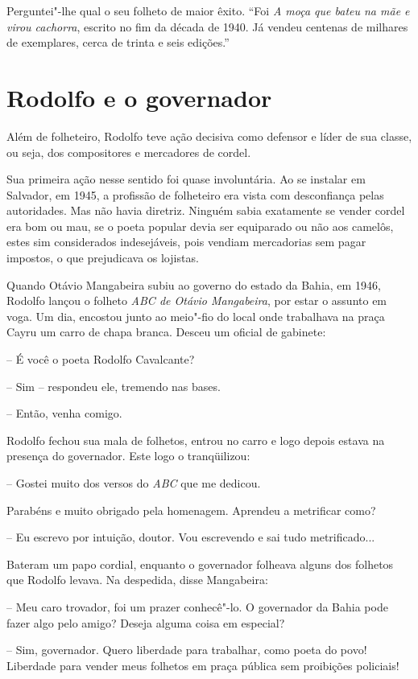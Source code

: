  Perguntei"-lhe qual o seu folheto de maior êxito. ``Foi
\textit{A moça que bateu na mãe e virou cachorra}, escrito no fim da
década de 1940. Já vendeu centenas de milhares de exemplares, cerca de
trinta e seis edições.'' 

\section{Rodolfo e o governador}

 Além de folheteiro, Rodolfo teve ação decisiva como defensor e líder de
sua classe, ou seja, dos compositores e mercadores de cordel. 

 Sua primeira ação nesse sentido foi quase involuntária. Ao se instalar
em Salvador, em 1945, a profissão de folheteiro era vista com
desconfiança pelas autoridades. Mas não havia diretriz. Ninguém sabia
exatamente se vender cordel era bom ou mau, se o poeta popular devia
ser equiparado ou não aos camelôs, estes sim considerados indesejáveis,
pois vendiam mercadorias sem pagar impostos, o que prejudicava os
lojistas. 

 Quando Otávio Mangabeira subiu ao governo do estado da Bahia, em 1946,
Rodolfo lançou o folheto \textit{ABC de Otávio Mangabeira}, por estar o
assunto em voga. Um dia, encostou junto ao meio"-fio do local onde
trabalhava na praça Cayru um carro de chapa branca. Desceu um oficial
de gabinete: 

 -- É você o poeta Rodolfo Cavalcante? 

 -- Sim -- respondeu ele, tremendo nas bases. 

 -- Então, venha comigo. 

 Rodolfo fechou sua mala de folhetos, entrou no carro e logo depois
estava na presença do governador. Este logo o tranqüilizou: 

 -- Gostei muito dos versos do \textit{ABC} que me dedicou. 

 Parabéns e muito obrigado pela homenagem. Aprendeu a metrificar como? 

 -- Eu escrevo por intuição, doutor. Vou escrevendo e sai tudo
metrificado... 

 Bateram um papo cordial, enquanto o governador folheava alguns dos
folhetos que Rodolfo levava. Na despedida, disse Mangabeira: 

 -- Meu caro trovador, foi um prazer conhecê"-lo. O governador da
Bahia pode fazer algo pelo amigo? Deseja alguma coisa em especial? 

 -- Sim, governador. Quero liberdade para trabalhar, como poeta do
povo! Liberdade para vender meus folhetos em praça pública sem
proibições policiais! 

